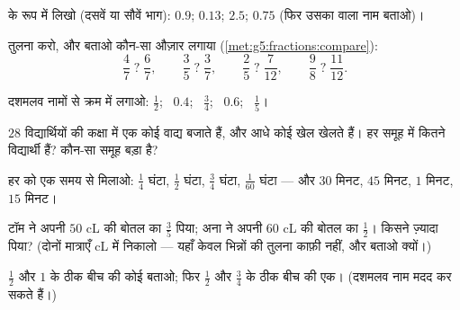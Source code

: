 \begin{exercise}[$\star$]\label{exo:g5:fractions:5}
 के रूप में लिखो (दसवें या सौवें भाग): $0.9$; \quad $0.13$;
\quad $2.5$; \quad $0.75$ (फिर उसका  वाला नाम बताओ)।
\end{exercise}

\begin{exercise}[$\star$]\label{exo:g5:fractions:6}
तुलना करो, और बताओ कौन-सा औज़ार लगाया
(\cref{met:g5:fractions:compare}):
\[
\frac47 \;?\; \frac67, \qquad
\frac35 \;?\; \frac37, \qquad
\frac25 \;?\; \frac{7}{12}, \qquad
\frac98 \;?\; \frac{11}{12} .
\]
\end{exercise}

\begin{exercise}[$\star$]\label{exo:g5:fractions:7}
दशमलव नामों से क्रम में लगाओ: $\frac12$; \ $0.4$; \ $\frac34$; \
$0.6$; \ $\frac15$।
\end{exercise}

\begin{exercise}[$\star$]\label{exo:g5:fractions:8}
$28$ विद्यार्थियों की कक्षा में एक  कोई वाद्य बजाते हैं, और
आधे कोई खेल खेलते हैं। हर समूह में कितने विद्यार्थी हैं? कौन-सा समूह बड़ा है?
\end{exercise}

\begin{exercise}[$\star$]\label{exo:g5:fractions:9}
हर  को एक समय से मिलाओ: $\frac14$ घंटा, $\frac12$ घंटा,
$\frac34$ घंटा, $\frac{1}{60}$ घंटा --- और $30$ मिनट, $45$ मिनट,
$1$ मिनट, $15$ मिनट।
\end{exercise}

\begin{exercise}[$\star\star$]\label{exo:g5:fractions:10}
टॉम ने अपनी $50$ cL की बोतल का $\frac35$ पिया; अना ने अपनी
$60$ cL की बोतल का $\frac12$। किसने ज़्यादा पिया? (दोनों मात्राएँ
cL में निकालो --- यहाँ केवल भिन्नों की तुलना काफ़ी नहीं, और बताओ क्यों।)
\end{exercise}

\begin{exercise}[$\star\star$]\label{exo:g5:fractions:11}
$\frac12$ और $1$ के ठीक बीच की कोई  बताओ; फिर $\frac12$ और
$\frac34$ के ठीक बीच की एक। (दशमलव नाम मदद कर सकते
हैं।)
\end{exercise}
